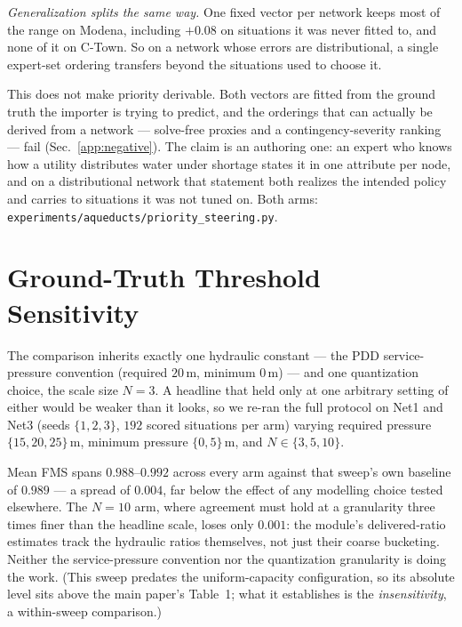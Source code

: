\documentclass[11pt]{article}
\begin{document}
\emph{Generalization splits the same way.} One fixed vector per network keeps most of
the range on Modena, including $+0.08$ on situations it was never fitted to, and none
of it on C-Town. So on a network whose errors are distributional, a single expert-set
ordering transfers beyond the situations used to choose it.

This does not make priority derivable. Both vectors are fitted from the ground truth
the importer is trying to predict, and the orderings that can actually be derived from
a network --- solve-free proxies and a contingency-severity ranking --- fail
(Sec.~\ref{app:negative}). The claim is an authoring one: an expert who knows how a
utility distributes water under shortage states it in one attribute per node, and on a
distributional network that statement both realizes the intended policy and carries to
situations it was not tuned on. Both arms:
\texttt{experiments/aqueducts/priority\_steering.py}.

\section{Ground-Truth Threshold Sensitivity}\label{app:sensitivity}

The comparison inherits exactly one hydraulic constant --- the PDD
service-pressure convention (required $20$\,m, minimum $0$\,m) --- and one
quantization choice, the scale size $N{=}3$. A headline that held only at one
arbitrary setting of either would be weaker than it looks, so we re-ran the full
protocol on Net1 and Net3 (seeds $\{1,2,3\}$, $192$ scored situations per arm)
varying required pressure $\{15,20,25\}$\,m, minimum pressure $\{0,5\}$\,m, and
$N \in \{3,5,10\}$.

Mean FMS spans $0.988$--$0.992$ across every arm against that sweep's own
baseline of $0.989$ --- a spread of $0.004$, far below the effect of any
modelling choice tested elsewhere. The $N{=}10$ arm, where agreement must hold at
a granularity three times finer than the headline scale, loses only $0.001$: the
module's delivered-ratio estimates track the hydraulic ratios themselves, not
just their coarse bucketing. Neither the service-pressure convention nor the
quantization granularity is doing the work. (This sweep predates the
uniform-capacity configuration, so its absolute level sits above the main paper's
Table~1; what it establishes is the \emph{insensitivity}, a within-sweep
comparison.)
\end{document}
